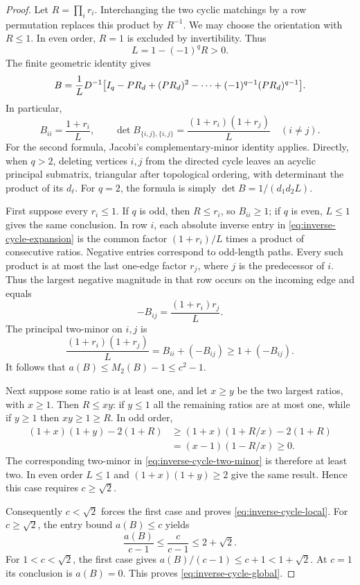 \begin{proof}
Let $R=\prod_i r_i$.  Interchanging the two cyclic matchings by a
row permutation replaces this product by $R^{-1}$.  We may choose
the orientation with $R\leq1$.  In even order, $R=1$ is excluded by
invertibility.  Thus
\[
 L=1-(-1)^qR>0.
\]
The finite geometric identity gives
\begin{equation}
 B=\frac1L D^{-1}
 \bigl[I_q-PR_d+(PR_d)^2-\cdots+
                   (-1)^{q-1}(PR_d)^{q-1}\bigr].
 \label{eq:inverse-cycle-expansion}
\end{equation}
In particular,
\begin{equation}
 B_{ii}=\frac{1+r_i}{L},\qquad
 \det B_{\{i,j\},\{i,j\}}=
 \frac{(1+r_i)(1+r_j)}{L}\quad(i\ne j).
 \label{eq:inverse-cycle-two-minor}
\end{equation}
For the second formula, Jacobi's complementary-minor identity
applies.  Directly, when $q>2$, deleting vertices $i,j$ from the
directed cycle leaves an acyclic principal submatrix, triangular
after topological ordering, with determinant the product of its
$d_\ell$.  For $q=2$, the formula is simply
$\det B=1/(d_1d_2L)$.

First suppose every $r_i\leq1$.  If $q$ is odd, then $R\leq r_i$,
so $B_{ii}\geq1$; if $q$ is even, $L\leq1$ gives the same
conclusion.  In row $i$, each absolute inverse entry in
\eqref{eq:inverse-cycle-expansion} is the common factor
$(1+r_i)/L$ times a product of consecutive ratios.  Negative entries
correspond to odd-length paths.  Every such product is at most the
last one-edge factor $r_j$, where $j$ is the predecessor of $i$.
Thus the largest negative magnitude in that row occurs on the
incoming edge and equals
\[
 -B_{ij}=\frac{(1+r_i)r_j}{L}.
\]
The principal two-minor on $i,j$ is
\[
 \frac{(1+r_i)(1+r_j)}L
 =B_{ii}+(-B_{ij})\geq1+(-B_{ij}).
\]
It follows that $a(B)\leq M_2(B)-1\leq c^2-1$.

Next suppose some ratio is at least one, and let $x\geq y$ be the
two largest ratios, with $x\geq1$.  Then $R\leq xy$: if $y\leq1$
all the remaining ratios are at most one, while if $y\geq1$ then
$xy\geq1\geq R$.  In odd order,
\begin{align*}
 (1+x)(1+y)-2(1+R)
 &\geq(1+x)(1+R/x)-2(1+R)\\
 &=(x-1)(1-R/x)\geq0.
\end{align*}
The corresponding two-minor in
\eqref{eq:inverse-cycle-two-minor} is therefore at least two.  In
even order $L\leq1$ and $(1+x)(1+y)\geq2$ give the same result.
Hence this case requires $c\geq\sqrt2$.

Consequently $c<\sqrt2$ forces the first case and proves
\eqref{eq:inverse-cycle-local}.  For $c\geq\sqrt2$, the entry bound
$a(B)\leq c$ yields
\[
 \frac{a(B)}{c-1}\leq\frac c{c-1}\leq2+\sqrt2.
\]
For $1<c<\sqrt2$, the first case gives
$a(B)/(c-1)\leq c+1<1+\sqrt2$.  At $c=1$ its conclusion is
$a(B)=0$.  This proves \eqref{eq:inverse-cycle-global}.
\end{proof}

